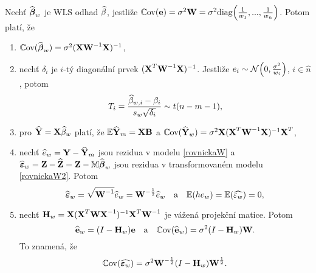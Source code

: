 \begin{theorem}
Nechť $\widehat{\boldsymbol{\beta}}_w$ je WLS odhad $\widehat{\beta}$, jestliže $\mathbb{C}\mathrm{ov}(\textbf{e})=\sigma^2\textbf{W}=\sigma^2\mathrm{diag}\Big(\frac{1}{w_1},...,\frac{1}{w_n}\Big)$. Potom platí, že
\begin{enumerate}[1)]
	\item $\mathbb{C}\mathrm{ov}(\widehat{\boldsymbol{\beta}}_w)=\sigma^2{(\textbf{X}{\textbf{W}^{-1}}\textbf{X})^{-1}}$,
	\item nechť $\delta_i$ je $i$-tý diagonální prvek ${(\textbf{X}^T{\textbf{W}^{-1}}\textbf{X})^{-1}}$. Jestliže $e_i\sim \mathcal{N}\Big(0,\frac{\sigma^2}{w_i}\Big)$, $i\in\hat{n}$, potom 
	$$ T_i=\frac{\widehat{\beta}_{w,i}-\beta_i}{s_w\sqrt{\delta_i}}\sim t(n-m-1),$$
	\item pro $\widehat{\textbf{Y}}=\textbf{X}\widehat{\beta}_w$ platí, že $\mathbb{E} \widehat{\textbf{Y}}_m=\textbf{X}\textbf{B}$ a $\mathbb{C}\mathrm{ov}(\widehat{\textbf{Y}}_w)=\sigma^2\textbf{X}{(\textbf{X}^T{\textbf{W}^{-1}}\textbf{X})^{-1}}\textbf{X}^T$,
\item nechť $\widehat{e}_w=\textbf{Y}-\widehat{\textbf{Y}}_m$ jsou rezidua v modelu \ref{rovnickaW} a $\widehat{\boldsymbol{\varepsilon}}_w=\textbf{Z}-\widehat{\textbf{Z}}=\textbf{Z}-\mathbb{M}\widehat{\boldsymbol{\beta}}_w$ jsou rezidua v transformovaném modelu \ref{rovnickaW2}. Potom
$$ \widehat{\boldsymbol{\varepsilon}}_w=\sqrt{{\textbf{W}^{-1}}}\widehat{e}_w=\textbf{W}^{-\frac{1}{2}}\widehat{e}_w\quad\text{a}\quad \mathbb{E}(he_w)=\mathbb{E}(\widehat{\varepsilon_w})=0,$$
\item nechť $\textbf{H}_w=\textbf{X}{(\textbf{X}^T{\textbf{W}\textbf{X}^{-1}})^{-1}}\textbf{X}^T{\textbf{W}^{-1}}$ je vážená projekční matice. Potom
$$ \widehat{\textbf{e}}_w=(I-\textbf{H}_w)\textbf{e}\quad\text{a}\quad \mathbb{C}\mathrm{ov}(\widehat{\textbf{e}}_w)=\sigma^2(I-\textbf{H}_w)\textbf{W}.$$
To znamená, že $$ \mathbb{C}\mathrm{ov}(\widehat{\boldsymbol{\varepsilon}_w})=\sigma^2\textbf{W}^{-\frac{1}{2}}(I-\textbf{H}_w)\textbf{W}^{\frac{1}{2}}.$$
\end{enumerate}


\end{theorem}
